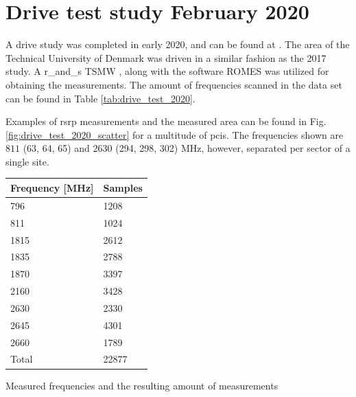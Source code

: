 \chapter{Drive test study February 2020}\label{app_drive_test_study_2020}

A drive study was completed in early 2020, and can be found at \cite{keyt-8g44-20}. The area of the Technical University of Denmark was driven in a similar fashion as the 2017 study. A \gls{r_and_s} TSMW \cite{Manual2017}, along with the software ROMES \cite{ROMESmanual} was utilized for obtaining the measurements. The amount of frequencies scanned in the data set can be found in Table \ref{tab:drive_test_2020}.

Examples of \gls{rsrp} measurements and the measured area can be found in Fig. \ref{fig:drive_test_2020_scatter} for a multitude of \glspl{pci}. The frequencies shown are $811$ (63, 64, 65) and $2630$ (294, 298, 302) MHz, however, separated per sector of a single site. 

\begin{margintable}
\begin{tabular}{@{}ll@{}}
\toprule
Frequency {[}MHz{]} & Samples                      \\ \midrule
796                 & 1208                         \\
811                 & 1024                         \\
1815                & 2612                         \\
1835                & 2788                         \\
1870                & 3397                         \\
2160                & 3428                         \\
2630                & 2330                         \\
2645                & 4301                         \\
2660                & 1789                         \\ \midrule
Total               & 22877	 \\ \bottomrule
\end{tabular}
\caption{Measured frequencies and the resulting amount of measurements}\label{tab:drive_test_2020}
\end{margintable}


